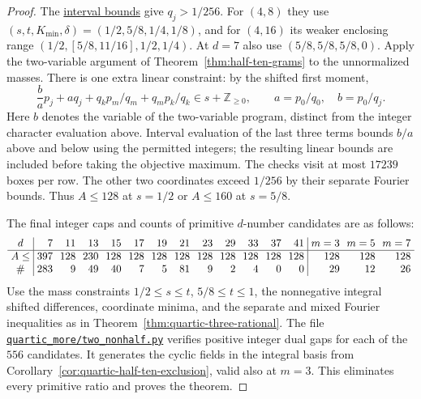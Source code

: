 \documentclass[11pt,reqno]{amsart}
\newcommand{\codefile}[1]{\href{https://github.com/sebastienpalcoux/grothendieck-ring-classification/blob/d5750105bb5758f3ad38d2e5464dfcc12c019816/supplements/rank6/sphericality/#1}{\nolinkurl{#1}}}
\newcommand{\codecheck}[2]{\href{https://github.com/sebastienpalcoux/grothendieck-ring-classification/blob/d5750105bb5758f3ad38d2e5464dfcc12c019816/supplements/rank6/sphericality/#1}{#2}}
\theoremstyle{remark}\newtheorem{remark}[theorem]{Remark}
\numberwithin{equation}{section}
\begin{document}
\begin{proof}
The \codecheck{quartic_more/nonhalf_bound.py}{interval bounds} give
$q_j>1/256$. For $(4,8)$ they use $(s,t,K_{\min},\delta)=
(1/2,5/8,1/4,1/8)$, and for $(4,16)$ its weaker enclosing
range $(1/2,[5/8,11/16],1/2,1/4)$. At $d=7$ also use
$(5/8,5/8,5/8,0)$. Apply the two-variable argument of
Theorem~\ref{thm:half-ten-grams} to the unnormalized masses.
There is one extra linear constraint: by the shifted first moment,
\[
 \frac ba p_j +a q_j + q_k p_m/q_m+q_m p_k/q_k
       \in s+\mathbb Z_{\ge0},
 \qquad a=p_0/q_0,\quad b=p_0/q_j .
\]
Here $b$ denotes the variable of the two-variable program, distinct
from the integer character evaluation above. Interval evaluation
of the last three terms bounds $b/a$ above and below using the
permitted integers; the resulting linear bounds are included before
taking the objective maximum. The checks visit at most $17239$
boxes per row. The other two coordinates exceed $1/256$ by their
separate Fourier bounds. Thus $A\le128$ at $s=1/2$ or $A\le160$
at $s=5/8$.

The final integer caps and counts of primitive $d$-number candidates
are as follows:
\[
\setlength{\arraycolsep}{3.4pt}\begin{array}{c|rrrrrrrrrrrr|rrr}
 d&7&11&13&15&17&19&21&23&29&33&37&41&m=3&m=5&m=7\\\hline
 A\le&397&128&230&128&128&128&128&128&128&128&128&128&128&128&128\\
 \#&283&9&49&40&7&5&81&9&2&4&0&0&29&12&26
\end{array}
\]
Use the mass constraints $1/2\le s\le t$, $5/8\le t\le1$, the
nonnegative integral shifted differences, coordinate minima, and
the separate and mixed Fourier inequalities as in
Theorem~\ref{thm:quartic-three-rational}. The file
\codefile{quartic_more/two_nonhalf.py} verifies positive integer
dual gaps for each of the $556$ candidates. It generates the
cyclic fields in the integral basis from
Corollary~\ref{cor:quartic-half-ten-exclusion}, valid also at
$m=3$. This eliminates every primitive ratio and proves the theorem.
\end{proof}
\end{document}
